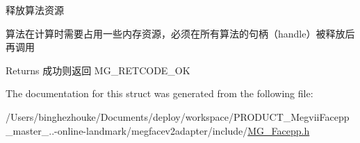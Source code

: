 释放算法资源

算法在计算时需要占用一些内存资源，必须在所有算法的句柄（handle）被释放后再调用 \begin{DoxyReturn}{Returns}
成功则返回 M\+G\+\_\+\+R\+E\+T\+C\+O\+D\+E\+\_\+\+OK 
\end{DoxyReturn}


The documentation for this struct was generated from the following file\+:\begin{DoxyCompactItemize}
\item 
/\+Users/binghezhouke/\+Documents/deploy/workspace/\+P\+R\+O\+D\+U\+C\+T\+\_\+\+Megvii\+Facepp\+\_\+master\+\_..-\/online-\/landmark/megfacev2adapter/include/\hyperlink{_m_g___facepp_8h}{M\+G\+\_\+\+Facepp.\+h}\end{DoxyCompactItemize}
